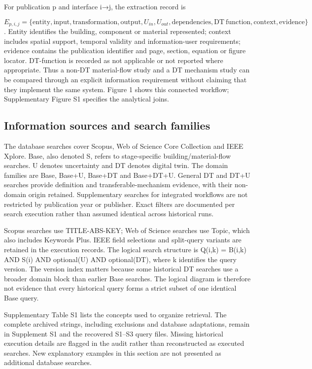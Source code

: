 For publication p and interface i→j, the extraction record is 

\[
E_{p,i,j}=\{\mathrm{entity,input,transformation,output},U_{in},U_{out},\mathrm{dependencies,DT\ function,context,evidence}\}
\]
. Entity identifies the building, component or material represented; context includes spatial support, temporal validity and information-user requirements; evidence contains the publication identifier and page, section, equation or figure locator. DT-function is recorded as not applicable or not reported where appropriate. Thus a non-DT material-flow study and a DT mechanism study can be compared through an explicit information requirement without claiming that they implement the same system. Figure 1 shows this connected workflow; Supplementary Figure S1 specifies the analytical joins.


\subsection{Information sources and search families}
The database searches cover Scopus, Web of Science Core Collection and IEEE Xplore. Base, also denoted S, refers to stage-specific building/material-flow searches. U denotes uncertainty and DT denotes digital twin. The domain families are Base, Base+U, Base+DT and Base+DT+U. General DT and DT+U searches provide definition and transferable-mechanism evidence, with their non-domain origin retained. Supplementary searches for integrated workflows are not restricted by publication year or publisher. Exact filters are documented per search execution rather than assumed identical across historical runs.

Scopus searches use TITLE-ABS-KEY; Web of Science searches use Topic, which also includes Keywords Plus. IEEE field selections and split-query variants are retained in the execution records. The logical search structure is Q(i,k) = B(i,k) AND S(i) AND optional(U) AND optional(DT), where k identifies the query version. The version index matters because some historical DT searches use a broader domain block than earlier Base searches. The logical diagram is therefore not evidence that every historical query forms a strict subset of one identical Base query.

Supplementary Table S1 lists the concepts used to organize retrieval. The complete archived strings, including exclusions and database adaptations, remain in Supplement S1 and the recovered S1–S3 query files. Missing historical execution details are flagged in the audit rather than reconstructed as executed searches. New explanatory examples in this section are not presented as additional database searches.

